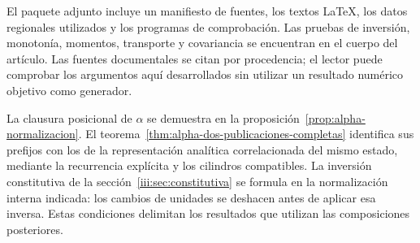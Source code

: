 El paquete adjunto incluye un manifiesto de fuentes, los textos LaTeX,
los datos regionales utilizados y los programas de comprobación. Las pruebas
de inversión, monotonía, momentos, transporte y covariancia se encuentran
en el cuerpo del artículo. Las fuentes documentales se citan por
procedencia; el lector puede comprobar los argumentos aquí desarrollados
sin utilizar un resultado numérico objetivo como generador.

La clausura posicional de $\alpha$ se demuestra en la
proposición~\ref{prop:alpha-normalizacion}. El
teorema~\ref{thm:alpha-dos-publicaciones-completas} identifica sus
prefijos con los de la representación analítica correlacionada del mismo
estado, mediante la recurrencia explícita y los cilindros compatibles.
La inversión constitutiva de
la sección~\ref{iii:sec:constitutiva} se formula en la normalización
interna indicada: los cambios de unidades se deshacen antes de aplicar
esa inversa. Estas condiciones delimitan los resultados que utilizan
las composiciones posteriores.
